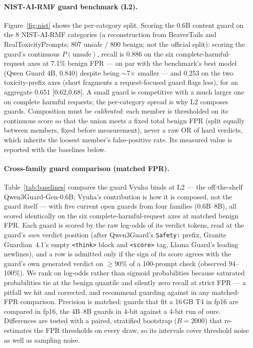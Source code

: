 \documentclass[11pt]{article}
\begin{document}
\paragraph{NIST-AI-RMF guard benchmark (L2).} Figure~\ref{fig:nist} shows the per-category split. Scoring the 0.6B content guard on the 8 NIST-AI-RMF
categories \citep{guard-bench} (a reconstruction from BeaverTails and RealToxicityPrompts;
807 unsafe / 800 benign; not the official split): scoring the guard's continuous $P(\text{unsafe})$,
recall is 0.886 on the six complete-harmful-request axes at 7.1\% benign FPR --- on par with the
benchmark's best model (Qwen Guard 4B, 0.840) despite being $\sim$7$\times$ smaller --- and 0.253 on
the two toxicity-prefix axes (short fragments a request-focused guard flags less), for an aggregate
0.651 [0.62,0.68]. A small guard is competitive with a much larger one on complete harmful requests;
the per-category spread is why L2 composes guards. Composition must be \emph{calibrated}: each member
is thresholded on its continuous score so that the union meets a fixed total benign FPR (split equally
between members, fixed before measurement), never a raw OR of hard verdicts, which inherits the
loosest member's false-positive rate. Its measured value is reported with the baselines below.

\paragraph{Cross-family guard comparison (matched FPR).} Table~\ref{tab:baselines} compares the guard
Vyuha binds at L2 --- the off-the-shelf Qwen3Guard-Gen-0.6B; Vyuha's contribution is how it is composed,
not the guard itself --- with five current open guards from four families (0.6B--8B), all scored
identically on the six complete-harmful-request axes at matched benign FPR. Each guard is scored by the
raw log-odds of its verdict tokens, read at the guard's \emph{own} verdict position (after Qwen3Guard's
\texttt{Safety:} prefix, Granite Guardian~4.1's empty \texttt{<think>} block and \texttt{<score>} tag,
Llama Guard's leading newlines), and a row is admitted only if the sign of its score agrees with the
guard's own generated verdict on $\geq$90\% of a 100-prompt check (observed 94--100\%). We rank on
log-odds rather than sigmoid probabilities because saturated probabilities tie at the benign quantile
and silently zero recall at strict FPR --- a pitfall we hit and corrected, and recommend guarding against
in any matched-FPR comparison. Precision is matched: guards that fit a 16\,GB T4 in fp16 are compared in
fp16, the 4B--8B guards in 4-bit against a 4-bit run of ours. Differences are tested with a paired,
stratified bootstrap ($B{=}2000$) that re-estimates the FPR thresholds on every draw, so its intervals
cover threshold noise as well as sampling noise.
\end{document}
